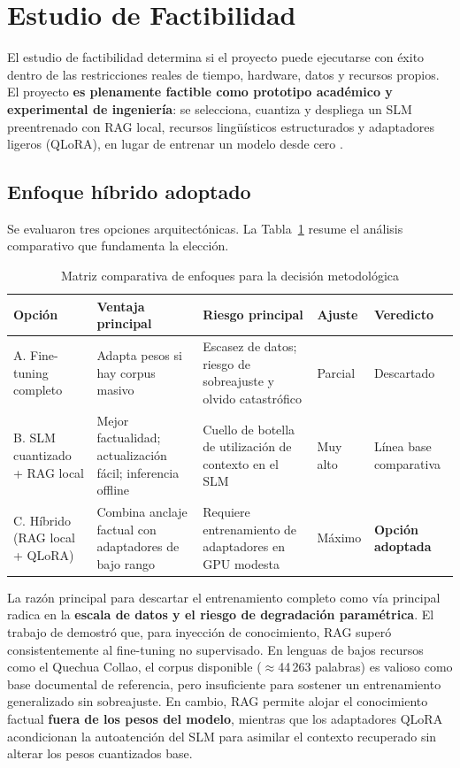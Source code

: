 \newpage
\section{Estudio de Factibilidad}

El estudio de factibilidad determina si el proyecto puede ejecutarse con éxito dentro de las restricciones reales de tiempo, hardware, datos y recursos propios. El proyecto \textbf{es plenamente factible como prototipo académico y experimental de ingeniería}: se selecciona, cuantiza y despliega un SLM preentrenado con RAG local, recursos lingüísticos estructurados y adaptadores ligeros (QLoRA), en lugar de entrenar un modelo desde cero \citep{Xu2024, Walusimbi2026}.

\subsection{Enfoque híbrido adoptado}

Se evaluaron tres opciones arquitectónicas. La Tabla~\ref{tab:comparativa_enfoques} resume el análisis comparativo que fundamenta la elección.

\begin{table}[H]
\centering
\caption{Matriz comparativa de enfoques para la decisión metodológica}
\label{tab:comparativa_enfoques}
\small
\begin{tabular}{@{}p{3.0cm}p{3.5cm}p{3.8cm}p{1.8cm}p{2.2cm}@{}}
\toprule
\textbf{Opción} & \textbf{Ventaja principal} & \textbf{Riesgo principal} & \textbf{Ajuste} & \textbf{Veredicto} \\
\midrule
A. Fine-tuning completo & Adapta pesos si hay corpus masivo & Escasez de datos; riesgo de sobreajuste y olvido catastrófico & Parcial & Descartado \\
\midrule
B. SLM cuantizado + RAG local & Mejor factualidad; actualización fácil; inferencia offline & Cuello de botella de utilización de contexto en el SLM & Muy alto & Línea base comparativa \\
\midrule
C. Híbrido (RAG local + QLoRA) & Combina anclaje factual con adaptadores de bajo rango & Requiere entrenamiento de adaptadores en GPU modesta & Máximo & \textbf{Opción adoptada} \\
\bottomrule
\end{tabular}
\end{table}

La razón principal para descartar el entrenamiento completo como vía principal radica en la \textbf{escala de datos y el riesgo de degradación paramétrica}. El trabajo de \citet{Ovadia2024} demostró que, para inyección de conocimiento, RAG superó consistentemente al fine-tuning no supervisado. En lenguas de bajos recursos como el Quechua Collao, el corpus disponible ($\approx$44\,263 palabras) es valioso como base documental de referencia, pero insuficiente para sostener un entrenamiento generalizado sin sobreajuste. En cambio, RAG permite alojar el conocimiento factual \textbf{fuera de los pesos del modelo}, mientras que los adaptadores QLoRA acondicionan la autoatención del SLM para asimilar el contexto recuperado sin alterar los pesos cuantizados base.


